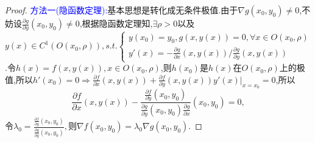 \documentclass[UTF8]{ctexart}
\newcommand{\p}[2]{\frac{\partial #1}{\partial #2}}
\begin{document}
    \begin{proof}
        \textcolor{blue}{方法一(隐函数定理):}基本思想是转化成无条件极值.由于$\nabla g(x_0,y_0)\not=0$,不妨设$\p{g}{y}(x_0,y_0)\not=0$,根据隐函数定理知,$\exists\rho>0$以及$y(x)\in C^1(O(x_0,\rho)),s.t.\begin{cases}
            y(x_0)=y_0,g(x,y(x))=0,\forall x\in O(x_0,\rho)\\
            y'(x)=-\p{g}{x}(x,y(x))/\p{g}{y}(x,y(x))
        \end{cases}$.令$h(x)=f(x,y(x)),x\in O(x_0,\rho)$,则$h(x_0)$是$h(x)$在$O(x_0,\rho)$上的极值,所以$h'(x_0)=0\Rightarrow\p{f}{x}(x,y(x))+\p{f}{y}(x,y(x))y'(x)|_{x=x_0}=0$,所以
        $$\p{f}{x}(x,y(x))-\frac{\p{f}{y}(x_0,y_0)}{\p{g}{y}(x_0,y_0)\p{g}{x}}(x_0,y_0)=0,$$
        令$\lambda_0=\frac{\p{f}{y}(x_0,y_0)}{\p{g}{y}(x_0,y_0)},$则$\nabla f(x_0,y_0)=\lambda_0\nabla g(x_0,y_0)$.


\end{proof}
\end{document}
